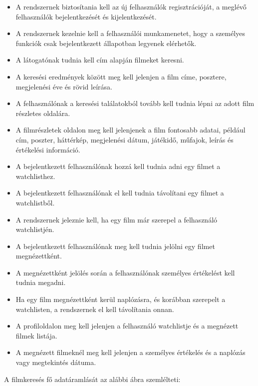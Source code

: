 \begin{itemize}
    \item A rendszernek biztosítania kell az új felhasználók regisztrációját, a meglévő felhasználók bejelentkezését és kijelentkezését.
    \item A rendszernek kezelnie kell a felhasználói munkamenetet, hogy a személyes funkciók csak bejelentkezett állapotban legyenek elérhetők.
    \item A látogatónak tudnia kell cím alapján filmeket keresni.
    \item A keresési eredmények között meg kell jelenjen a film címe, posztere, megjelenési éve és rövid leírása.
    \item A felhasználónak a keresési találatokból tovább kell tudnia lépni az adott film részletes oldalára.
    \item A filmrészletek oldalon meg kell jelenjenek a film fontosabb adatai, például cím, poszter, háttérkép, megjelenési dátum, játékidő, műfajok, leírás és értékelési információ.
    \item A bejelentkezett felhasználónak hozzá kell tudnia adni egy filmet a watchlisthez.
    \item A bejelentkezett felhasználónak el kell tudnia távolítani egy filmet a watchlistből.
    \item A rendszernek jeleznie kell, ha egy film már szerepel a felhasználó watchlistjén.
    \item A bejelentkezett felhasználónak meg kell tudnia jelölni egy filmet megnézettként.
    \item A megnézettként jelölés során a felhasználónak személyes értékelést kell tudnia megadni.
    \item Ha egy film megnézettként kerül naplózásra, és korábban szerepelt a watchlisten, a rendszernek el kell távolítania onnan.
    \item A profiloldalon meg kell jelenjen a felhasználó watchlistje és a megnézett filmek listája.
    \item A megnézett filmeknél meg kell jelenjen a személyes értékelés és a naplózás vagy megtekintés dátuma.
\end{itemize}

A filmkeresés fő adatáramlását az alábbi ábra szemlélteti:


